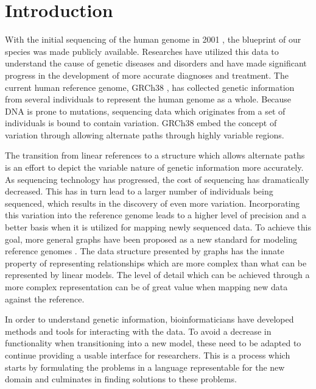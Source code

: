 \documentclass[thesis.tex]{subfiles}
\begin{document}
\chapter{Introduction}
With the initial sequencing of the human genome in 2001 \cite{human_genome}, the blueprint of our species was made publicly available. Researches have utilized this data to understand the cause of genetic diseases and disorders and have made significant progress in the development of more accurate diagnoses and treatment. The current human reference genome, GRCh38 \cite{grch38}, has collected genetic information from several individuals to represent the human genome as a whole. Because DNA is prone to mutations, sequencing data which originates from a set of individuals is bound to contain variation. GRCh38 embed the concept of variation through allowing alternate paths through highly variable regions.\\
\par\noindent
The transition from linear references to a structure which allows alternate paths is an effort to depict the variable nature of genetic information more accurately. As sequencing technology has progressed, the cost of sequencing has dramatically decreased. This has in turn lead to a larger number of individuals being sequenced, which results in the discovery of even more variation. Incorporating this variation into the reference genome leads to a higher level of precision and a better basis when it is utilized for mapping newly sequenced data. To achieve this goal, more general graphs have been proposed as a new standard for modeling reference genomes \cite{extending_reference_assembly_models}. The data structure presented by graphs has the innate property of representing relationships which are more complex than what can be represented by linear models. The level of detail which can be achieved through a more complex representation can be of great value when mapping new data against the reference.\\
\par\noindent
In order to understand genetic information, bioinformaticians have developed methods and tools for interacting with the data. To avoid a decrease in functionality when transitioning into a new model, these need to be adapted to continue providing a usable interface for researchers. This is a process which starts by formulating the problems in a language representable for the new domain and culminates in finding solutions to these problems.
\end{document}
